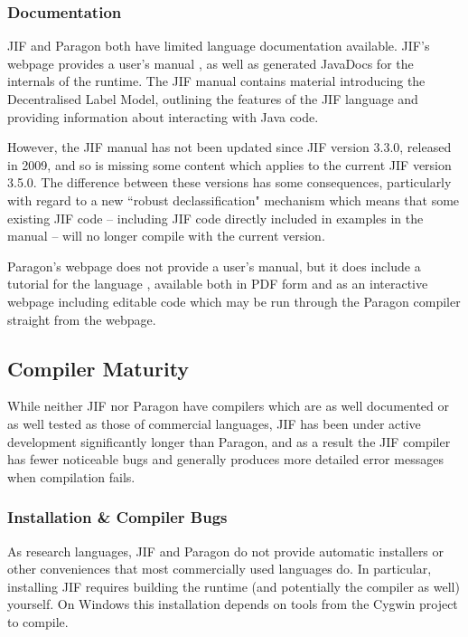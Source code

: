 \subsubsection{Documentation}

JIF and Paragon both have limited language documentation available. JIF's webpage \cite{jifwebsite} provides a user's manual \cite{jifmanual}, as well as generated JavaDocs for the internals of the runtime. The JIF manual contains material introducing the Decentralised Label Model, outlining the features of the JIF language and providing information about interacting with Java code.

However, the JIF manual has not been updated since JIF version 3.3.0, released in 2009, and so is missing some content which applies to the current JIF version 3.5.0. The difference between these versions has some consequences, particularly with regard to a new ``robust declassification" mechanism which means that some existing JIF code -- including JIF code directly included in examples in the manual -- will no longer compile with the current version.

Paragon's webpage \cite{parawebsite} does not provide a user's manual, but it does include a tutorial for the language \cite{paratutorial}, available both in PDF form and as an interactive webpage including editable code which may be run through the Paragon compiler straight from the webpage.

\subsection{Compiler Maturity}

While neither JIF nor Paragon have compilers which are as well documented or as well tested as those of commercial languages, JIF has been under active development significantly longer than Paragon, and as a result the JIF compiler has fewer noticeable bugs and generally produces more detailed error messages when compilation fails.

\subsubsection{Installation \& Compiler Bugs}

As research languages, JIF and Paragon do not provide automatic installers or other conveniences that most commercially used languages do. In particular, installing JIF requires building the runtime (and potentially the compiler as well) yourself. On Windows this installation depends on tools from the Cygwin project \cite{cygwinpage} to compile.

